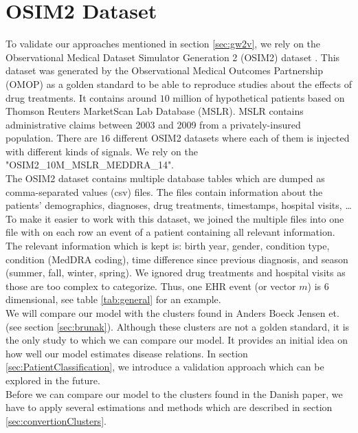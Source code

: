 \section{OSIM2 Dataset}
\label{sec:osim2DS}

To validate our approaches mentioned in section \ref{sec:gw2v}, we rely on the Observational Medical Dataset Simulator Generation 2 (OSIM2) dataset \cite{OSIM:online}. This dataset was generated by the Observational Medical Outcomes Partnership (OMOP) as a golden standard to be able to reproduce studies about the effects of drug treatments. It contains around $10$ million of hypothetical patients based on Thomson Reuters MarketScan Lab Database (MSLR). MSLR contains administrative claims between 2003 and 2009 from a privately-insured population. There are $16$ different OSIM2 datasets where each of them is injected with different kinds of signals. We rely on the "OSIM2\_10M\_MSLR\_MEDDRA\_14". \\

The OSIM2 dataset contains multiple database tables which are dumped as comma-separated values (csv) files. The files contain information about the patients' demographics, diagnoses, drug treatments, timestamps, hospital visits, \ldots \\
To make it easier to work with this dataset, we joined the multiple files into one file with on each row an event of a patient containing all relevant information. The relevant information which is kept is: birth year, gender, condition type, condition (MedDRA coding), time difference since previous diagnosis, and season (summer, fall, winter, spring). We ignored drug treatments and hospital visits as those are too complex to categorize. Thus, one EHR event (or vector $m$) is $6$ dimensional, see table \ref{tab:general} for an example. \\	

We will compare our model with the clusters found in Anders Boeck Jensen et. \cite{Brunak:article} (see section \ref{sec:brunak}). Although these clusters are not a golden standard, it is the only study to which we can compare our model. It provides an initial idea on how well our model estimates disease relations. In section \ref{sec:PatientClassification}, we introduce a validation approach which can be explored in the future. \\
Before we can compare our model to the clusters found in the Danish paper, we have to apply several estimations and methods which are described in section \ref{sec:convertionClusters}.


